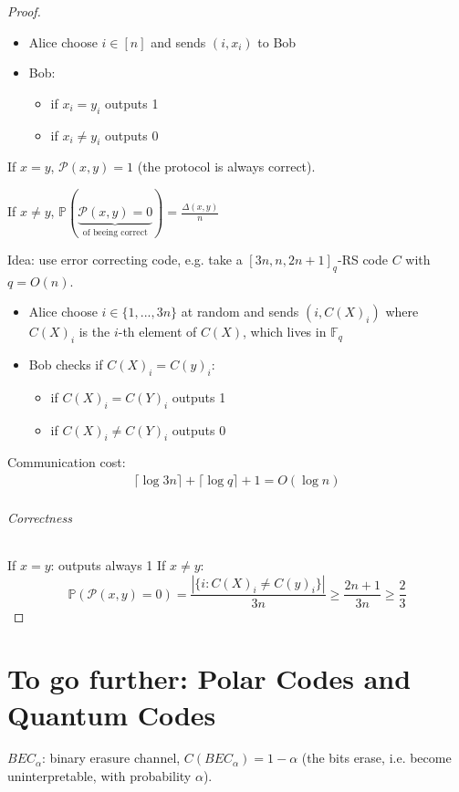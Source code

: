 \documentclass{article}
\begin{document}
\begin{proof}
\begin{itemize}
\item Alice choose $i\in [n]$ and sends $(i,x_i)$ to Bob
\item Bob:
\begin{itemize}
\item if $x_i=y_i$ outputs 1
\item if $x_i\neq y_i$ outputs 0
\end{itemize}
\end{itemize}

If $x=y$, $\mathcal{P}(x,y)=1$ (the protocol is always correct).

If $x\neq y$, $\mathbb{P}(\underbrace{\mathcal{P}(x,y)=0}_{\text{of beeing correct}})=\frac{\Delta(x,y)}{n}$

Idea: use error correcting code, e.g. take a $[3n,n,2n+1]_q$-RS code $C$ with $q=O(n)$.
\begin{itemize}
\item Alice choose $i\in \{1,...,3n\}$ at random and sends $(i,C(X)_i)$ where $C(X)_i$ is the $i$-th element of $C(X)$, which lives in $\mathbb{F}_q$
\item Bob checks if $C(X)_i=C(y)_i$:
\begin{itemize}
\item if $C(X)_i=C(Y)_i$ outputs 1
\item if $C(X)_i\neq C(Y)_i$ outputs 0
\end{itemize}
\end{itemize}

Communication cost:
\begin{align*}
\lceil \log 3n \rceil + \lceil \log q \rceil + 1 = O( \log n)
\end{align*}


\paragraph{Correctness} If $x=y$: outputs always 1
If $x\neq y$: 
\[\mathbb{P}(\mathcal{P}(x,y)=0)=\frac{|\{i: C(X)_i \neq C(y)_i\}|}{3n}\geq \frac{2n+1}{3n}\geq \frac{2}{3}\]
\end{proof}

\newpage
\part*{To go further: Polar Codes and Quantum Codes}
$BEC_\alpha$: binary erasure channel, $C(BEC_\alpha)=1-\alpha$ (the bits erase, i.e. become uninterpretable, with probability $\alpha$).
\end{document}
